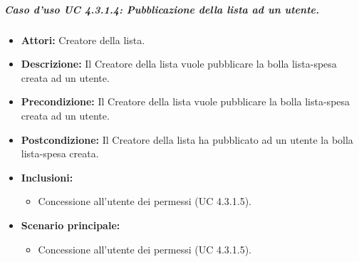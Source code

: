 \subparagraph{Caso d'uso UC 4.3.1.4: Pubblicazione della lista ad un utente.}
\label{Caso d'uso UC 4.3.1.4: Pubblicazione della lista ad un utente.}

\FloatBarrier
\begin{itemize}
\item \textbf{Attori:} Creatore della lista.
\item \textbf{Descrizione:} Il Creatore della lista vuole pubblicare la bolla lista-spesa creata ad un utente.
\item \textbf{Precondizione:} Il Creatore della lista vuole pubblicare la bolla lista-spesa creata ad un utente. 
\item \textbf{Postcondizione:} Il Creatore della lista ha pubblicato ad un utente la bolla lista-spesa creata.
\item \textbf{Inclusioni:}
	\begin{itemize}
	\item{Concessione all'utente dei permessi (UC 4.3.1.5).}
	\end{itemize}
	\item \textbf{Scenario principale:}
	\begin{itemize}
	\item{Concessione all'utente dei permessi (UC 4.3.1.5).}
	\end{itemize}
\end{itemize}